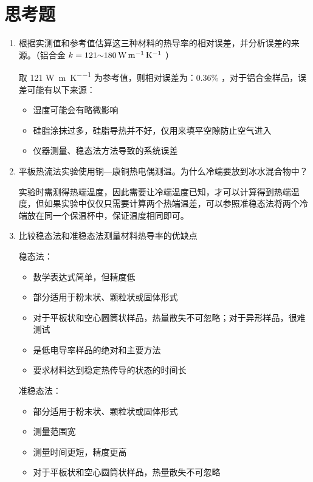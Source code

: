 \documentclass[a4paper,utf8]{article}
\newcommand{\TTR}[0]{\watt\per\m\per\K}
\begin{document}
\section{思考题}
    \begin{enumerate}
        \item 根据实测值和参考值估算这三种材料的热导率的相对误差，并分析误差的来源。（铝合金 $k=\qrange{121}{180}{\TTR}$ ）\par
        取 121 \unit{\TTR} 为参考值，则相对误差为：0.36\% ，对于铝合金样品，误差可能有以下来源：
        \begin{itemize}
            \item 湿度可能会有略微影响
            \item 硅脂涂抹过多，硅脂导热并不好，仅用来填平空隙防止空气进入
            \item 仪器测量、稳态法方法导致的系统误差
        \end{itemize}
        \item 平板热流法实验使用铜—康铜热电偶测温。为什么冷端要放到冰水混合物中？\par
        实验时需测得热端温度，因此需要让冷端温度已知，才可以计算得到热端温度，但如果实验中仅仅只需要计算两个热端温差，可以参照准稳态法将两个冷端放在同一个保温杯中，保证温度相同即可。
        \item 比较稳态法和准稳态法测量材料热导率的优缺点\par
            稳态法：
            \begin{itemize}
                \item 数学表达式简单，但精度低
                \item 部分适用于粉末状、颗粒状或固体形式
                \item 对于平板状和空心圆筒状样品，热量散失不可忽略；对于异形样品，很难测试
                \item 是低电导率样品的绝对和主要方法
                \item 要求材料达到稳定热传导的状态的时间长
            \end{itemize}\par
            准稳态法：
            \begin{itemize}
                \item 部分适用于粉末状、颗粒状或固体形式
                \item 测量范围宽
                \item 测量时间更短，精度更高
                \item 对于平板状和空心圆筒状样品，热量散失不可忽略

\end{itemize}
\end{enumerate}
\end{document}
